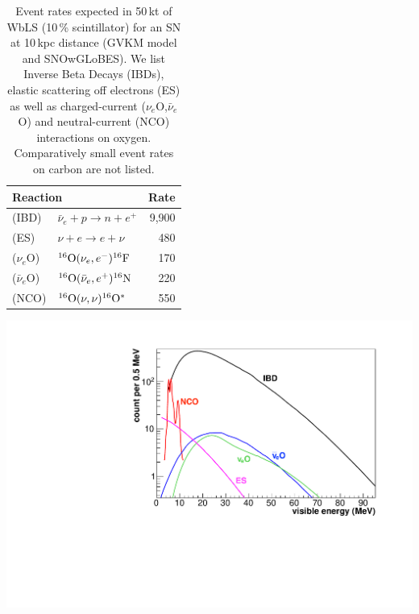 \begin{table}[h!]
\begin{minipage}[b]{0.4\textwidth}
\begin{tabular}{llr}
\hline
\multicolumn{2}{l}{Reaction} & Rate \\
\hline
(IBD) & $\bar\nu_e+p\to n+e^+$ & 9,900 \\
(ES) & $\nu+e \to e+\nu$ & 480 \\
($\nu_e$O) & ${^{16}\rm{O}}(\nu_e,e^-){^{16}{\rm F}}$ & 170 \\
($\bar\nu_e$O) & ${^{16}\rm{O}}(\bar\nu_e,e^+){^{16}{\rm N}}$ & 220 \\
(NCO) & ${^{16}\rm{O}}(\nu,\nu){^{16}{\rm O}^*}$  & 550 \\
\hline
\end{tabular}
\caption{Event rates expected in 50\,kt of WbLS (10\,\% scintillator) for an SN at 10\,kpc distance (GVKM model \cite{Gava:2009pj} and SNOwGLoBES). We list Inverse Beta Decays (IBDs), elastic scattering off electrons (ES) as well as charged-current ($\nu_e$O,$\bar\nu_e$O) and neutral-current (NCO) interactions on oxygen. Comparatively small event rates on carbon are not listed.}
\label{tab:snrates}
\end{minipage}\hfill
\begin{minipage}[b]{0.55\textwidth}
\centering
\includegraphics[width=\textwidth]{pics/sn_spectra_new.pdf}
\label{fig:snspectra}
\end{minipage}
\end{table}

